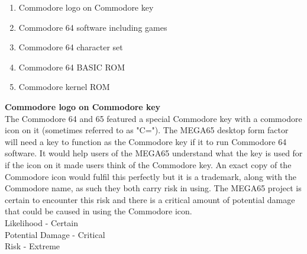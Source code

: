 \begin{enumerate}
\item Commodore logo on Commodore key
\item Commodore 64 software including games
\item Commodore 64 character set
\item Commodore 64 BASIC ROM
\item Commodore kernel ROM
\end{enumerate}

\textbf{Commodore logo on Commodore key} \\
The Commodore 64 and 65 featured a special Commodore key with a commodore icon on it (sometimes referred to as "C="). The MEGA65 desktop form factor will need a key to function as the Commodore key if it to run Commodore 64 software. It would help users of the MEGA65 understand what the key is used for if the icon on it made users think of the Commodore key. An exact copy of the Commodore icon would fulfil this perfectly but it is a trademark, along with the Commodore name, as such they both carry risk in using. The MEGA65 project is certain to encounter this risk and there is a critical amount of potential damage that could be caused in using the Commodore icon. \\

Likelihood - Certain \\
Potential Damage - Critical \\
Risk - Extreme \\


